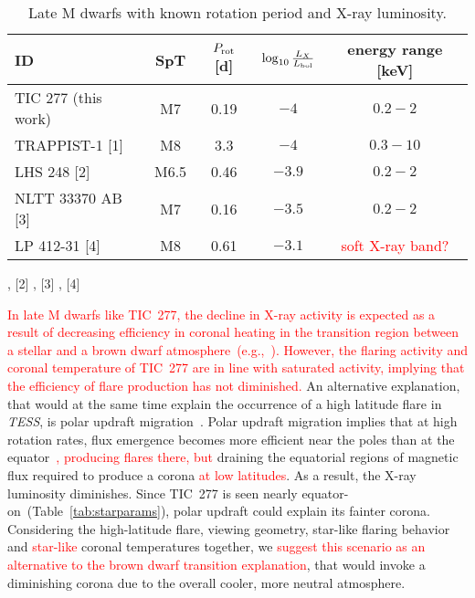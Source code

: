 \documentclass[twocolumn]{aastex631}
\begin{document}
\begin{table*}[]
    \centering
    \caption{Late M dwarfs with known rotation period and X-ray luminosity.}
    \begin{tabular}{lcccc}
        ID & SpT &$P_{\rm rot}$ [d] & $\log_{10} \frac{L_X}{L_{\rm bol}} $ & energy range [keV]\\\hline
        TIC 277 (this work) & M7 & 0.19 & $-4$ & $0.2-2$ \\
        TRAPPIST-1 [1] & M8 & 3.3 & $-4$ & $0.3-10$\\
        LHS 248 [2] & M6.5 & 0.46 & $-3.9$ & $0.2-2$\\
        NLTT 33370 AB [3] & M7 & 0.16 & $-3.5$ & $0.2-2$ \\
        LP 412-31  [4] & M8 & 0.61 & $-3.1$& \textcolor{red}{soft X-ray band?}\\\hline
    \end{tabular}
     \footnotesize
     \vspace{0.1cm}\newline
    [1] \citet{brown2023coronal}, 
    [2] \citet{cook2014trends}, 
    [3] \citet{williams2015simultaneous}, 
    [4] \citet{stelzer2006simultaneous}    
    \label{tab:latmlxlbol}
\end{table*}



\textcolor{red}{In late M dwarfs like TIC~277, the decline in X-ray activity is expected as a result of decreasing efficiency in coronal heating in the transition region between a stellar and a brown dwarf atmosphere~(e.g.,~\citealt{williams2014trends}). However, the flaring activity and coronal temperature of TIC~277 are in line with saturated activity, implying that the efficiency of flare production has not diminished.} An alternative explanation, that would at the same time explain the occurrence of a high latitude flare in \textit{TESS}, is polar updraft migration~\citep{stepien2001rosat}. Polar updraft migration implies that at high rotation rates, flux emergence becomes more efficient near the poles than at the equator~\citep{weber2016modeling}\textcolor{red}{, producing flares there, but} draining the equatorial regions of magnetic flux required to produce a corona \textcolor{red}{at low latitudes}. As a result, the X-ray luminosity diminishes. Since TIC~277 is seen nearly equator-on~(Table~\ref{tab:starparams}), polar updraft could explain its fainter corona. Considering the high-latitude flare, viewing geometry, star-like flaring behavior and \textcolor{red}{star-like} coronal temperatures together, we \textcolor{red}{suggest this scenario as an alternative to the brown dwarf transition explanation}, that would invoke a diminishing corona due to the overall cooler, more neutral atmosphere. 
\end{document}
